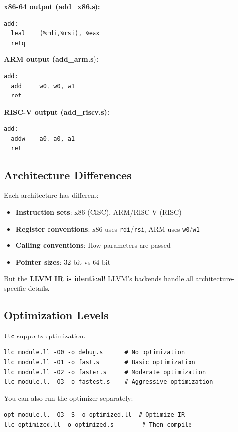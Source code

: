 \documentclass[11pt]{article}
\begin{document}
\textbf{x86-64 output (add\_x86.s):}
\begin{lstlisting}[style=ir]
add:
  leal    (%rdi,%rsi), %eax
  retq
\end{lstlisting}

\textbf{ARM output (add\_arm.s):}
\begin{lstlisting}[style=ir]
add:
  add     w0, w0, w1
  ret
\end{lstlisting}

\textbf{RISC-V output (add\_riscv.s):}
\begin{lstlisting}[style=ir]
add:
  addw    a0, a0, a1
  ret
\end{lstlisting}

\subsection{Architecture Differences}

Each architecture has different:
\begin{itemize}[noitemsep]
  \item \textbf{Instruction sets}: x86 (CISC), ARM/RISC-V (RISC)
  \item \textbf{Register conventions}: x86 uses \texttt{rdi}/\texttt{rsi}, ARM uses \texttt{w0}/\texttt{w1}
  \item \textbf{Calling conventions}: How parameters are passed
  \item \textbf{Pointer sizes}: 32-bit vs 64-bit
\end{itemize}

But the \textbf{LLVM IR is identical}! LLVM's backends handle all architecture-specific details.

\subsection{Optimization Levels}

\texttt{llc} supports optimization:
\begin{lstlisting}[style=ts]
llc module.ll -O0 -o debug.s      # No optimization
llc module.ll -O1 -o fast.s       # Basic optimization
llc module.ll -O2 -o faster.s     # Moderate optimization
llc module.ll -O3 -o fastest.s    # Aggressive optimization
\end{lstlisting}

You can also run the optimizer separately:
\begin{lstlisting}[style=ts]
opt module.ll -O3 -S -o optimized.ll  # Optimize IR
llc optimized.ll -o optimized.s        # Then compile
\end{lstlisting}
\end{document}
